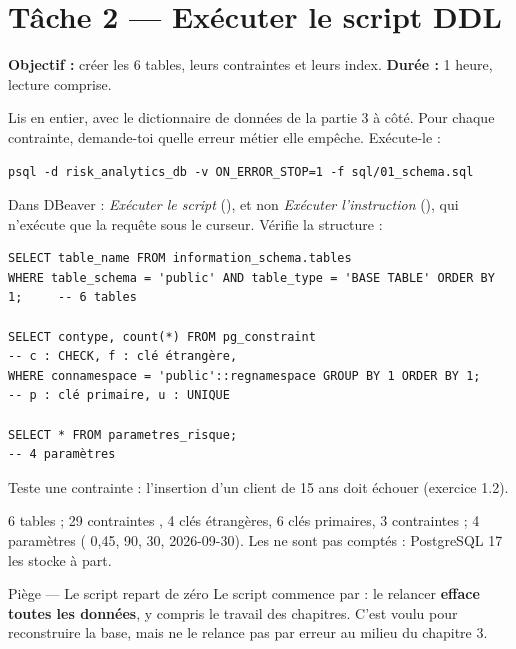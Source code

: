 \section{Tâche 2 --- Exécuter le script DDL}

\textbf{Objectif :} créer les 6 tables, leurs contraintes et leurs index. \textbf{Durée :} 1 heure,
lecture comprise.

\begin{itemize}[label={}, leftmargin=1.2em]
\tache Lis  en entier, avec le dictionnaire de données de la partie 3 à côté.
Pour chaque contrainte, demande-toi quelle erreur métier elle empêche.
\tache Exécute-le :
\begin{lstlisting}[style=shell]
psql -d risk_analytics_db -v ON_ERROR_STOP=1 -f sql/01_schema.sql
\end{lstlisting}
Dans DBeaver : \emph{Exécuter le script} (), et non \emph{Exécuter l'instruction}
(), qui n'exécute que la requête sous le curseur.
\tache Vérifie la structure :
\begin{lstlisting}[style=sql]
SELECT table_name FROM information_schema.tables
WHERE table_schema = 'public' AND table_type = 'BASE TABLE' ORDER BY 1;     -- 6 tables

SELECT contype, count(*) FROM pg_constraint                                -- c : CHECK, f : clé étrangère,
WHERE connamespace = 'public'::regnamespace GROUP BY 1 ORDER BY 1;         -- p : clé primaire, u : UNIQUE

SELECT * FROM parametres_risque;                                           -- 4 paramètres
\end{lstlisting}
\tache Teste une contrainte : l'insertion d'un client de 15 ans doit échouer (exercice 1.2).
\end{itemize}

\begin{resultat}
6 tables ; 29 contraintes , 4 clés étrangères, 6 clés primaires, 3 contraintes
 ; 4 paramètres ( 0,45,  90, 
30,  2026-09-30). Les  ne sont pas comptés : PostgreSQL 17 les stocke
à part.
\end{resultat}

\begin{piege}{Piège --- Le script repart de zéro}
Le script commence par  : le relancer \textbf{efface toutes les données},
y compris le travail des chapitres. C'est voulu pour reconstruire la base, mais ne le relance pas par
erreur au milieu du chapitre 3.
\end{piege}


